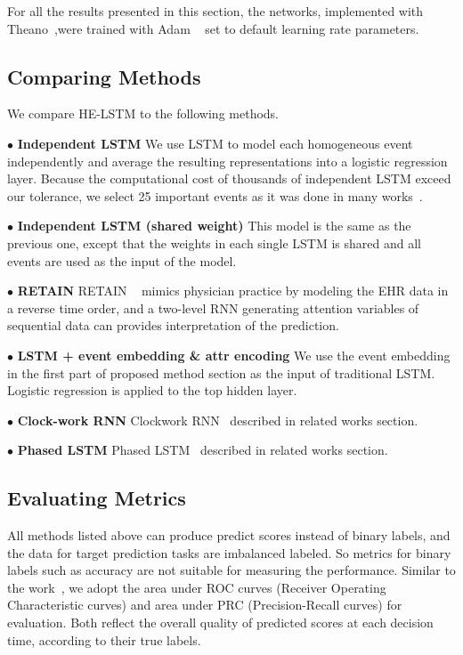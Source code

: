 \documentclass[letterpaper]{article} %
\begin{document}
For all
the results presented in this section, the networks, implemented with Theano~\cite{bergstra2010theano},were trained with Adam ~\cite{Kingma2014Adam} set to default learning rate
parameters.


\subsection{Comparing Methods}
We compare HE-LSTM to the following methods.

$\bullet$ \textbf{Independent LSTM}
We use LSTM to model each homogeneous event independently and average the resulting representations into a logistic regression layer. Because the computational cost of thousands of independent LSTM exceed our tolerance, we select 25 important events as it was done in many works~\cite{alaa2017learning}.

$\bullet$ \textbf{Independent LSTM (shared weight)}
This model is the same as the previous one, except that the weights in each single LSTM is shared and all events are used as the input of the model.


$\bullet$ \textbf{RETAIN}
RETAIN ~\cite{choi2016retain} mimics physician practice by modeling the EHR data in a reverse time order, and a two-level RNN generating attention variables of sequential data can provides interpretation of the prediction.


$\bullet$ \textbf{LSTM + event embedding \& attr encoding}
We use the event embedding in the first part of proposed method section as the input of traditional LSTM. Logistic regression is applied to the top hidden layer.


$\bullet$ \textbf{Clock-work RNN}
Clockwork RNN~\cite{koutnik2014clockwork} described in related works
section.

$\bullet$ \textbf{Phased LSTM}
Phased LSTM~\cite{neil2016phased} described in related works section.



\subsection{Evaluating Metrics}
All methods listed above can produce predict scores instead of binary labels, and the data for target prediction tasks are imbalanced labeled. So metrics for binary labels such as accuracy are not suitable for measuring the performance. Similar to the work~\cite{choi2016retain,Liu2015Temporal}, we adopt the area under ROC curves (Receiver Operating Characteristic curves) and area under PRC (Precision-Recall curves) for evaluation. Both reflect the overall quality of predicted scores at each decision time, according to their true labels. 
\end{document}
